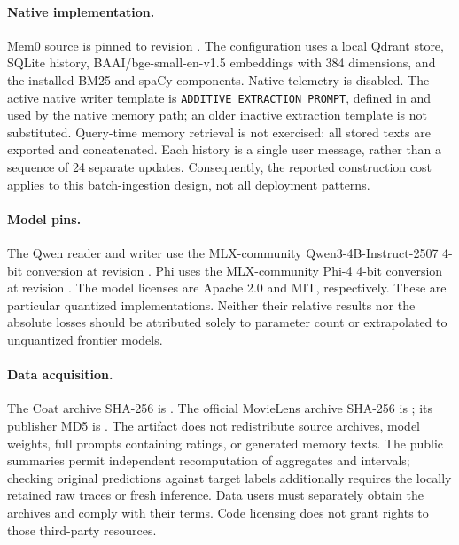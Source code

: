 \paragraph{Native implementation.} Mem0 source is pinned to revision . The configuration uses a local Qdrant store, SQLite history, BAAI/bge-small-en-v1.5 embeddings with 384 dimensions, and the installed BM25 and spaCy components. Native telemetry is disabled. The active native writer template is \texttt{ADDITIVE\_EXTRACTION\_PROMPT}, defined in  and used by the native memory path; an older inactive extraction template is not substituted. Query-time memory retrieval is not exercised: all stored texts are exported and concatenated. Each history is a single user message, rather than a sequence of 24 separate updates. Consequently, the reported construction cost applies to this batch-ingestion design, not all deployment patterns.

\paragraph{Model pins.} The Qwen reader and writer use the MLX-community Qwen3-4B-Instruct-2507 4-bit conversion at revision . Phi uses the MLX-community Phi-4 4-bit conversion at revision . The model licenses are Apache 2.0 and MIT, respectively. These are particular quantized implementations. Neither their relative results nor the absolute losses should be attributed solely to parameter count or extrapolated to unquantized frontier models.

\paragraph{Data acquisition.} The Coat archive SHA-256 is . The official MovieLens archive SHA-256 is ; its publisher MD5 is . The artifact does not redistribute source archives, model weights, full prompts containing ratings, or generated memory texts. The public summaries permit independent recomputation of aggregates and intervals; checking original predictions against target labels additionally requires the locally retained raw traces or fresh inference. Data users must separately obtain the archives and comply with their terms. Code licensing does not grant rights to those third-party resources.

